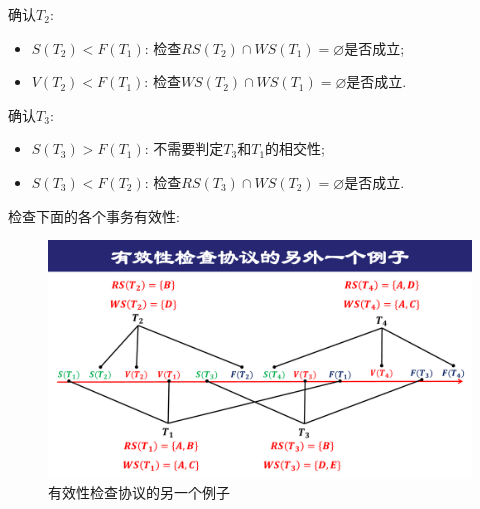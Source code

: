 确认$T_2$:
\begin{itemize}
  \item $S(T_2)<F(T_1)$: 检查$RS(T_2)\cap WS(T_1) = \varnothing$是否成立;
  \item $V(T_2)<F(T_1)$: 检查$WS(T_2) \cap WS(T_1) = \varnothing$是否成立.
\end{itemize}

确认$T_3$:
\begin{itemize}
  \item $S(T_3)>F(T_1)$: 不需要判定$T_3$和$T_1$的相交性;
  \item $S(T_3)<F(T_2)$: 检查$RS(T_3)\cap WS(T_2) = \varnothing$是否成立.
\end{itemize}

\begin{example}
  检查下面的各个事务有效性:
  \begin{figure}[H]
      \centering
      \includegraphics[width=.8\textwidth]{figure/有效性的例子.pdf}
      \caption{有效性检查协议的另一个例子}
  \end{figure}
\end{example}

